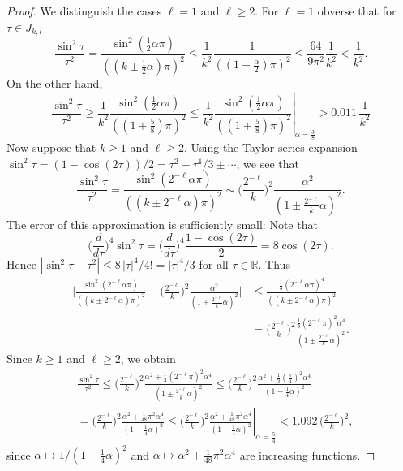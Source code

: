 \documentclass[leqno]{amsart}
\theoremstyle{definition}
\theoremstyle{remark}
\numberwithin{equation}{section}
\newcommand{\R}{\mathbb{R}}
\begin{document}
\begin{proof}
We distinguish the cases $\ell = 1$ and $\ell \ge 2$. For $\ell =1$ obverse that for $\tau\in J_{k,l}$
\[
\frac{\sin ^2 \tau}{\tau^2 }
= \frac{\sin ^2 (\frac12 \alpha \pi)}{((k \pm \frac12 \alpha) \pi)^2 } 
\le \frac{1}{k^2} \frac{1}{((1-\frac\alpha 2)\pi)^2}
\le \frac{64}{9\pi^2} \frac{1}{k^2}
< \frac{1}{k^2}.
\]
On the other hand,
\[
\frac{\sin ^2 \tau}{\tau^2 }
\ge \frac{1}{k^2} \frac{\sin ^2 (\frac12 \alpha \pi)}{((1+\frac58)\pi)^2}
\le \left.\frac{1}{k^2} \frac{\sin ^2 (\frac12 \alpha \pi)}{((1+\frac58)\pi)^2}\right|_{\alpha=\frac38}
> 0.011\, \frac{1}{k^2}
\]
Now suppose that $k\ge 1$ and $\ell\ge 2$. Using the Taylor series expansion $\sin ^2 \tau = (1-\cos (2 \tau))/2 = \tau^2 -\tau^{ 4 }/{3} \pm \cdots$, we see that
\[
\frac{\sin ^2 \tau}{\tau^2 } = \frac{\sin ^2 (2^{-\ell} \alpha \pi)}{((k \pm 2^{-\ell} \alpha) \pi)^2 }
\sim\Big(\frac{2^{-\ell}}{k}\Big)^2 \frac{\alpha^2 }{(1 \pm \frac{2^{-\ell}}{k} \alpha)^2 }.
\]
The error of this approximation is sufficiently small: Note that
\[
\Big(\frac{d}{d \tau}\Big)^{ 4 } \sin ^2 \tau = \Big(\frac{d}{d \tau}\Big)^{ 4 } \frac{1-\cos (2 \tau)}{2} = 8 \cos (2 \tau).
\]
Hence $|\sin ^2 \tau-\tau^2 | \leq 8 \, | \tau|^{ 4 }/ 4 ! = | \tau|^{ 4 }/3$ for all $\tau\in\R$. Thus
\begin{align*}
\Big|\frac{\sin ^2 (2^{-\ell} \alpha \pi)}{((k \pm 2^{-\ell} \alpha) \pi)^2 }-\Big(\frac{2^{-\ell}}{k}\Big)^2 \frac{\alpha^2 }{(1 \pm \frac{2^{-\ell}}{k} \alpha)^2 }\Big|
& \le \frac{\frac{1}{3}\left(2^{-\ell} \alpha \pi\right)^{ 4 }}{((k \pm 2^{-\ell} \alpha) \pi)^2 } \\
& = \Big(\frac{2^{-\ell}}{k}\Big)^2 \frac{\frac{1}{3}(2^{-\ell} \pi)^2 \alpha^{ 4 }}{(1 \pm \frac{2^{-\ell}}{k} \alpha)^2 }.
\end{align*}
Since $k\ge 1$ and $\ell\ge 2$, we obtain
\[
\begin{aligned}
& \frac{\sin ^2 \tau}{\tau^2 }
\le\Big(\frac{2^{-\ell}}{k}\Big)^2 \frac{\alpha^2 + \frac{1}{3}(2^{-\ell} \pi)^2 \alpha^{ 4 }}{(1 \pm \frac{2^{-\ell}}{k} \alpha)^2 }
\le\Big(\frac{2^{-\ell}}{k}\Big)^2 \frac{\alpha^2 + \frac{1}{3}\left(\frac \pi 4\right)^2 \alpha^{ 4 }}{(1 - \frac{1}{4} \alpha)^2 } \\
& =\Big(\frac{2^{-\ell}}{k}\Big)^2 \frac{\alpha^2 + \frac{1}{48} \pi^2 \alpha^{ 4 }}{(1-\frac{1}{4} \alpha)^2 } \le\left.\Big(\frac{2^{-\ell}}{k}\Big)^2 \frac{\alpha^2 + \frac{1}{48} \pi^2 \alpha^{ 4 }}{(1-\frac{1}{4} \alpha)^2 }\right|_{\alpha = \frac{5}{4}}
< 1.092 \, \Big(\frac{2^{-\ell}}{k}\Big)^2 ,
\end{aligned}
\]
since $\alpha\mapsto 1/(1-\frac{1}{4} \alpha)^2 $ and $\alpha\mapsto \alpha^2 + \frac{1}{48} \pi^2 \alpha^{ 4 } $ are increasing functions.


\end{proof}
\end{document}
